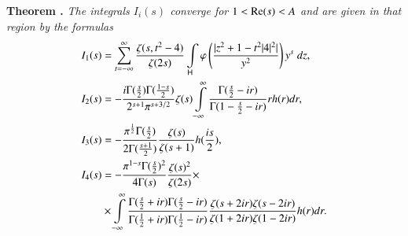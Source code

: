 \medskip
\noindent
{\bfseries Theorem .\label{art11-thm2}} 
\textit{The integrals $I_i (s)$ converge for $1 < \operatorname{Re} (s) < A$ and are given in that region by the formulas}
\begin{align*}
I_1 (s) & = \sum\limits^\infty_{t = - \infty} \frac{\zeta(s, t^2 - 4)}{\zeta(2s)} \int\limits_{\mathsf{H}} \varphi 
\left(\frac{|z^2 + 1-t^2 |4|^2|}{y^2} \right) y^s \; dz,\\
I_2 (s) & = - \frac{i \Gamma (\frac{s}{2}) \Gamma (\frac{1-s}{2})}{2^{s+1} \pi^{s+3/2}} \zeta(s) \int\limits^\infty_{-\infty} \frac{\Gamma (\frac{s}{2}-ir)}{\Gamma (1-\frac{s}{2} -ir)} rh(r) dr,\\
I_3 (s)  & = - \frac{\pi^{\frac{1}{2}} \Gamma (\frac{s}{2})}{2 \Gamma (\frac{s+1}{2})} \frac{\zeta(s)}{\zeta(s+1)} h(\frac{is}{2}),\\
I_4 (s) & = - \frac{\pi^{1-s} \Gamma (\frac{s}{2})^2}{4 \Gamma (s)} \frac{\zeta(s)^2}{\zeta(2s)} \times \\
& \times \int\limits^\infty_{-\infty} \frac{\Gamma (\frac{s}{2} + ir) \Gamma (\frac{s}{2} - ir)}{\Gamma (\frac{1}{2} + ir) \Gamma (\frac{1}{2} - ir)} \frac{\zeta (s+ 2 ir) \zeta (s - 2 ir)}{\zeta (1+ 2 i r) \zeta (1-2 ir)} h (r) dr. 
\end{align*}

